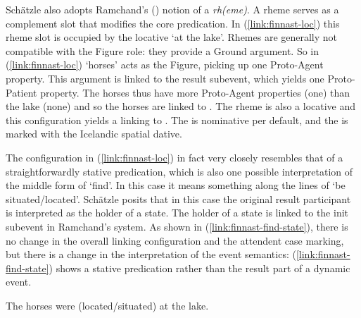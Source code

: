 \documentclass[output=paper,hidelinks]{langscibook}
\begin{document}
Sch\"{a}tzle also adopts Ramchand's 
(\citeyear{ramchand08})  notion of a {\em rh(eme)}.  A rheme serves
as a complement slot that modifies the core predication.  In
(\ref{link:finnast-loc})  this rheme slot is occupied by the locative `at the
lake'.  Rhemes are generally not compatible with the Figure role: they provide a
Ground argument.  So in (\ref{link:finnast-loc})  `horses' acts as the Figure,
picking up one Proto-Agent property.  This argument is linked to the result subevent,
which yields one Proto-Patient property.  The horses thus have more Proto-Agent
properties (one) than the lake (none) and so the horses are linked to \SUBJ.  The rheme is
also a locative and this configuration yields a linking to \OBL.  The \SUBJ is
nominative per default, and the \OBL is marked with the Icelandic spatial
dative.



The  configuration in (\ref{link:finnast-loc}) in fact very closely resembles
that of a straightforwardly stative predication, which is also one possible
interpretation of the middle form of `find'.  In this case it means something
along the lines of `be situated/located'.  Sch\"{a}tzle posits that in this
case the original result participant  is interpreted as the holder of a
state.  The holder of a state is linked to the init subevent in Ramchand's system.  As shown
in (\ref{link:finnast-find-state}), there is no change in the overall linking
configuration and the attendent case marking, but there is a change in the
interpretation of the event semantics: (\ref{link:finnast-find-state}) shows a
stative predication rather than the result part of a dynamic event. 


\ea  \label{link:finnast-find-state}
The horses were (located/situated) at the lake.
\z
\end{document}
